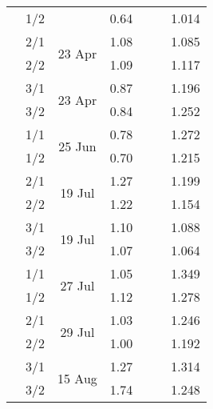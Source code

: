 \begin{table}
\begin{threeparttable}
\begin{tabular}{c c c c c c c}
		& 1/2 & & 0.64 & & & 1.014 \\
		& 2/1 & \multirow{2}{*}{23 Apr} & 1.08 & & & 1.085 \\
		& 2/2 & & 1.09 & & & 1.117 \\
		& 3/1 & \multirow{2}{*}{23 Apr}  & 0.87 & & & 1.196 \\
		& 3/2 & & 0.84 & & & 1.252 \\
	\hline
		\multirow{6}{}{\rotatebox[origin=c]{90}{NGC 612}}& 1/1 & \multirow{2}{*}{25 Jun} & 0.78 & & & 1.272 \\
		& 1/2 & & 0.70 & & & 1.215 \\
		& 2/1 & \multirow{2}{*}{19 Jul} & 1.27 & & & 1.199 \\
		& 2/2 & & 1.22 & & & 1.154 \\
		& 3/1 & \multirow{2}{*}{19 Jul}  & 1.10 & & & 1.088 \\
		& 3/2 & & 1.07 & & & 1.064 \\
	\hline
		\multirow{6}{}{\rotatebox[origin=c]{90}{NGC 1399}}& 1/1 & \multirow{2}{*}{27 Jul} & 1.05 & & & 1.349 \\
		& 1/2 & & 1.12 & & & 1.278 \\
		& 2/1 & \multirow{2}{*}{29 Jul} & 1.03 & & & 1.246 \\
		& 2/2 & & 1.00 & & & 1.192 \\
		& 3/1 & \multirow{2}{*}{15 Aug}  & 1.27 & & & 1.314 \\
		& 3/2 & & 1.74 & & & 1.248 \\
	\hline
		



	\end{tabular}
	\begin{tablenote}
	\end{tablenote}
\end{threeparttable}
\end{table}


